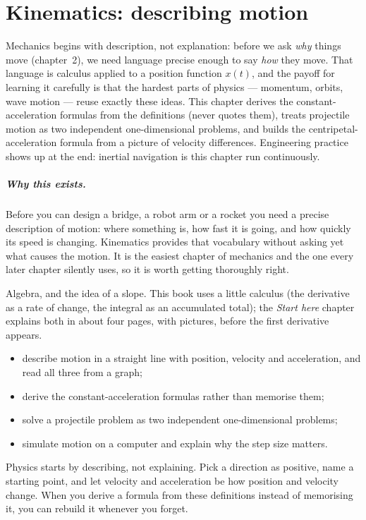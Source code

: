 \chapter{Kinematics: describing motion}\label{ch:kinematics}

Mechanics begins with description, not explanation: before we ask \emph{why}
things move (chapter~2), we need language precise enough to say
\emph{how} they move. That language is calculus applied to a position function
$x(t)$, and the payoff for learning it carefully is that the hardest parts of
physics --- momentum, orbits, wave motion --- reuse exactly these ideas. This
chapter derives the constant-acceleration formulas from the definitions (never
quotes them), treats projectile motion as two independent one-dimensional
problems, and builds the centripetal-acceleration formula from a picture of
velocity differences. Engineering practice shows up at the end: inertial
navigation is this chapter run continuously.

\paragraph{Why this exists.} Before you can design a bridge, a robot arm or a rocket you need a
precise description of motion: where something is, how fast it is going, and how quickly its speed is changing.
Kinematics provides that vocabulary without asking yet what causes the motion. It is the easiest chapter of
mechanics and the one every later chapter silently uses, so it is worth getting thoroughly right.

\begin{rulebox}
Algebra, and the idea of a slope. This book uses a little calculus (the derivative as a rate of change, the integral as an accumulated total); the \emph{Start here} chapter explains both in about four pages, with pictures, before the first derivative appears.
\end{rulebox}
\begin{wins}
\begin{itemize}
\item describe motion in a straight line with position, velocity and acceleration, and read all three from a graph;
\item derive the constant-acceleration formulas rather than memorise them;
\item solve a projectile problem as two independent one-dimensional problems;
\item simulate motion on a computer and explain why the step size matters.
\end{itemize}
\end{wins}
\begin{principle}
Physics starts by describing, not explaining. Pick a direction as positive, name a starting point, and let velocity and acceleration be how position and velocity change. When you derive a formula from these definitions instead of memorising it, you can rebuild it whenever you forget.
\end{principle}

